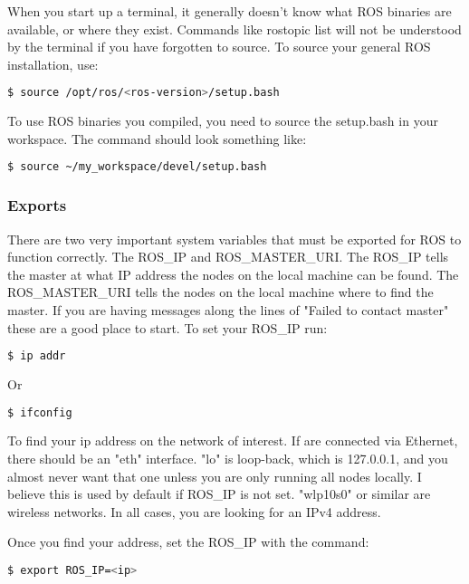 When you start up a terminal, it generally doesn't know what ROS binaries are available, or where they exist. Commands like rostopic list will not be understood by the terminal if you have forgotten to source. To source your general ROS installation, use: 

\begin{lstlisting}[language=bash]
  $ source /opt/ros/<ros-version>/setup.bash
\end{lstlisting}

To use ROS binaries you compiled, you need to source the setup.bash in your workspace. The command should look something like:

\begin{lstlisting}[language=bash]
  $ source ~/my_workspace/devel/setup.bash
\end{lstlisting}

\subsubsection{Exports}

There are two very important system variables that must be exported for ROS to function correctly. The ROS\_IP and ROS\_MASTER\_URI. The ROS\_IP tells the master at what IP address the nodes on the local machine can be found. The ROS\_MASTER\_URI tells the nodes on the local machine where to find the master. If you are having messages along the lines of "Failed to contact master" these are a good place to start. To set your ROS\_IP run:

\begin{lstlisting}[language=bash]
  $ ip addr
\end{lstlisting} 

Or

\begin{lstlisting}[language=bash]
  $ ifconfig
\end{lstlisting} 

To find your ip address on the network of interest. If are connected via Ethernet, there should be an "eth" interface. "lo" is loop-back, which is 127.0.0.1, and you almost never want that one unless you are only running all nodes locally. I believe this is used by default if ROS\_IP is not set. "wlp10s0" or similar are wireless networks. In all cases, you are looking for an IPv4 address.

Once you find your address, set the ROS\_IP with the command:

\begin{lstlisting}[language=bash]
  $ export ROS_IP=<ip>
\end{lstlisting} 

